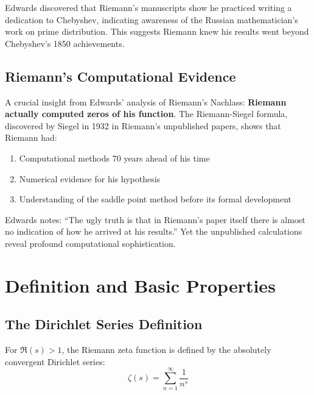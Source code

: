 \begin{historicalnote}
Edwards \cite{edwards1974} discovered that Riemann's manuscripts show he practiced writing a dedication to Chebyshev, indicating awareness of the Russian mathematician's work on prime distribution. This suggests Riemann knew his results went beyond Chebyshev's 1850 achievements.
\end{historicalnote}

\subsection{Riemann's Computational Evidence}

A crucial insight from Edwards' analysis of Riemann's Nachlass: \textbf{Riemann actually computed zeros of his function}. The Riemann-Siegel formula, discovered by Siegel in 1932 in Riemann's unpublished papers, shows that Riemann had:

\begin{enumerate}
\item Computational methods 70 years ahead of his time
\item Numerical evidence for his hypothesis
\item Understanding of the saddle point method before its formal development
\end{enumerate}

Edwards notes: ``The ugly truth is that in Riemann's paper itself there is almost no indication of how he arrived at his results.'' Yet the unpublished calculations reveal profound computational sophistication.

\section{Definition and Basic Properties}
\label{sec:definition_basic}

\subsection{The Dirichlet Series Definition}

\begin{definition}
\label{def:zeta_original}
For $\Re(s) > 1$, the Riemann zeta function is defined by the absolutely convergent Dirichlet series:
\begin{equation}
\zeta(s) = \sum_{n=1}^{\infty} \frac{1}{n^s}
\label{eq:zeta_dirichlet}
\end{equation}
\end{definition}

